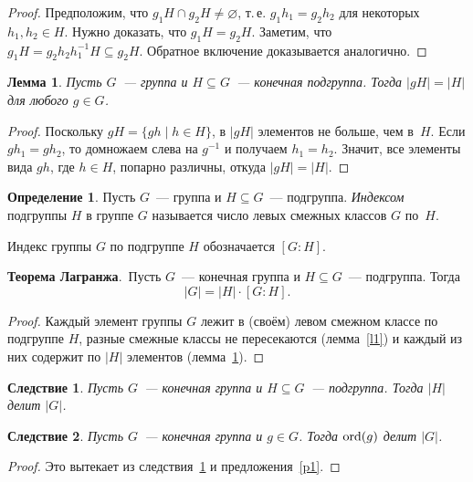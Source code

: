 \documentclass[a4paper,10pt]{amsart}
\def\ord{{\rm ord}}%
\def\ord{{\rm ord}}
\def\ord{{\rm ord}}
\newtheorem{lemma}{Лемма}
\newtheorem{corollary}{Следствие}
\theoremstyle{definition}
\newtheorem{definition}{Определение}
\theoremstyle{remark}
\begin{document}
\begin{proof}
Предположим, что $g_1H\cap g_2H\ne\varnothing$, т.\,е.
$g_1h_1=g_2h_2$ для некоторых $h_1,h_2\in H$. Нужно доказать, что
$g_1H=g_2H$. Заметим, что $g_1H=g_2h_2h_1^{-1}H\subseteq g_2H$.
Обратное включение доказывается аналогично.
\end{proof}

\begin{lemma} \label{l2}
Пусть $G$~--- группа и $H\subseteq G$~--- конечная подгруппа. Тогда
$|gH|=|H|$ для любого $g\in G$.
\end{lemma}

\begin{proof}
Поскольку $gH=\{gh \mid h\in H\}$, в $|gH|$ элементов не больше, чем
в~$H$. Если $gh_1=gh_2$, то домножаем слева на $g^{-1}$ и получаем
$h_1=h_2$. Значит, все элементы вида $gh$, где $h\in H$, попарно
различны, откуда $|gH|=|H|$.
\end{proof}

\begin{definition}
Пусть $G$~--- группа и $H\subseteq G$~--- подгруппа. {\it Индексом}
подгруппы $H$ в группе $G$ называется число левых смежных классов
$G$ по~$H$.
\end{definition}

Индекс группы $G$ по подгруппе $H$ обозначается $[G:H]$.

\smallskip

{\bf Теорема Лагранжа}.\ Пусть $G$~--- конечная группа и $H\subseteq
G$~--- подгруппа. Тогда
$$
|G| = |H| \cdot [G:H].
$$

\begin{proof}
Каждый элемент группы $G$ лежит в (своём) левом смежном классе по
подгруппе $H$, разные смежные классы не пересекаются
(лемма~\ref{l1}) и каждый из них содержит по $|H|$ элементов
(лемма~\ref{l2}).
\end{proof}

\begin{corollary} \label{c1}
Пусть $G$~--- конечная группа и $H\subseteq G$~--- подгруппа. Тогда
$|H|$ делит $|G|$.
\end{corollary}

\begin{corollary} \label{c2}
Пусть $G$~--- конечная группа и $g\in G$. Тогда $\ord(g)$ делит
$|G|$.
\end{corollary}

\begin{proof}
Это вытекает из следствия~\ref{c1} и предложения~\ref{p1}.
\end{proof}
\end{document}
